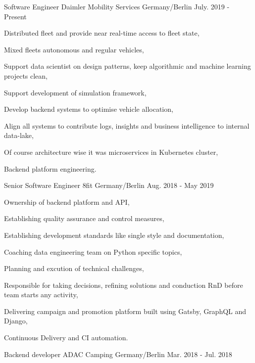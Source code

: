 \begin{cventries}
  \cventry
    {Software Engineer}
    {Daimler Mobility Services}
    {Germany/Berlin}
    {July. 2019 - Present}
    {
      \begin{cvitems}
        \item {Distributed fleet and provide near real-time access to fleet state,}
        \item {Mixed fleets autonomous and regular vehicles,}
        \item {Support data scientist on design patterns, keep algorithmic and machine learning projects clean,}
        \item {Support development of simulation framework,}
        \item {Develop backend systems to optimise vehicle allocation,}
        \item {Align all systems to contribute logs, insights and business intelligence to internal data-lake,}
        \item {Of course architecture wise it was microservices in Kubernetes cluster,}
        \item {Backend platform engineering.}
      \end{cvitems}
    }
  \cventry
    {Senior Software Engineer}
    {8fit}
    {Germany/Berlin}
    {Aug. 2018 - May 2019}
    {
      \begin{cvitems}
        \item {Ownership of backend platform and API,}
        \item {Establishing quality assurance and control measures,}
        \item {Establishing development standards like single style and documentation,}
        \item {Coaching data engineering team on Python specific topics,}
        \item {Planning and excution of technical challenges,}
        \item {Responsible for taking decisions, refining solutions and conduction RnD before team starts any activity,}
        \item {Delivering campaign and promotion platform built using Gatsby, GraphQL and Django,}
        \item {Continuous Delivery and CI automation.}
      \end{cvitems}
    }
  \cventry
    {Backend developer}
    {ADAC Camping}
    {Germany/Berlin}
    {Mar. 2018 - Jul. 2018}
    {
      \begin{cvitems}

\end{cvitems}}
\end{cventries}
